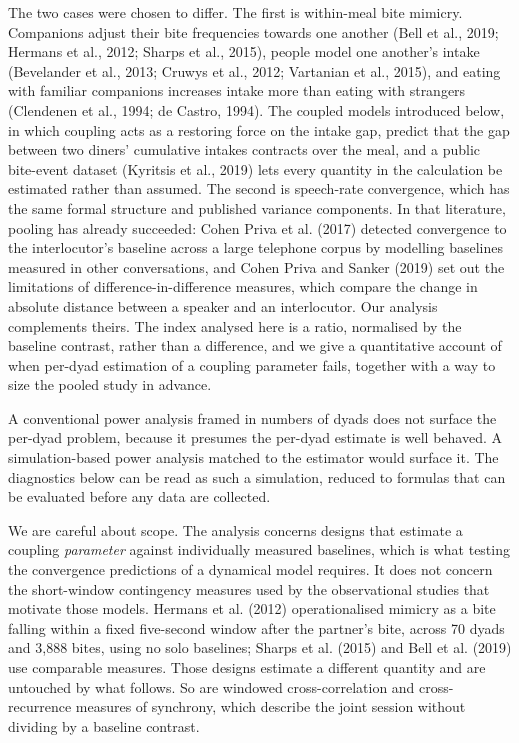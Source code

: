 \documentclass[12pt]{article}
\begin{document}
The two cases were chosen to differ. The first is within-meal bite mimicry.
Companions adjust their bite frequencies towards one another (Bell et al., 2019;
Hermans et al., 2012; Sharps et al., 2015), people model one another's intake
(Bevelander et al., 2013; Cruwys et al., 2012; Vartanian et al., 2015), and
eating with familiar companions increases intake more than eating with strangers
(Clendenen et al., 1994; de Castro, 1994). The coupled models introduced below,
in which coupling acts as a restoring force on the intake gap, predict that the
gap between two diners' cumulative intakes contracts over the meal, and a public bite-event dataset (Kyritsis et al., 2019) lets every quantity in the calculation be estimated rather than assumed.
The second is speech-rate convergence, which has the same formal structure and
published variance components. In that literature, pooling has already succeeded:
Cohen Priva et al. (2017) detected convergence to the interlocutor's
baseline across a large telephone corpus by modelling baselines measured in other
conversations, and Cohen Priva and Sanker (2019) set out the limitations of difference-in-difference measures, which
compare the change in absolute distance between a speaker and an interlocutor. Our
analysis complements theirs. The index analysed here is a ratio, normalised by the
baseline contrast, rather than a difference, and we give a quantitative account of
when per-dyad estimation of a coupling parameter fails, together with a way to size
the pooled study in advance.

A conventional power analysis framed in numbers of dyads does not surface the
per-dyad problem, because it presumes the per-dyad estimate is well behaved. A
simulation-based power analysis matched to the estimator would surface it. The
diagnostics below can be read as such a simulation, reduced to formulas that can
be evaluated before any data are collected.

We are careful about scope. The analysis concerns designs that estimate a
coupling \emph{parameter} against individually measured baselines, which is what
testing the convergence predictions of a dynamical model requires. It does not
concern the short-window contingency measures used by the observational studies
that motivate those models. Hermans et al. (2012) operationalised mimicry as a
bite falling within a fixed five-second window after the partner's bite, across
70 dyads and 3{,}888 bites, using no solo baselines; Sharps et al. (2015) and Bell
et al. (2019) use comparable measures. Those designs estimate a different quantity
and are untouched by what follows. So are windowed cross-correlation and
cross-recurrence measures of synchrony, which describe the joint session without
dividing by a baseline contrast.
\end{document}
